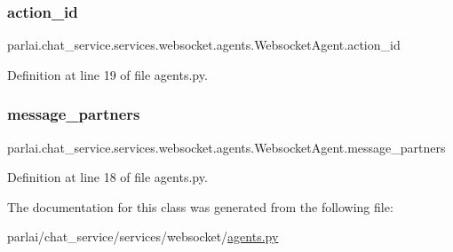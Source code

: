 \subsubsection{\texorpdfstring{action\+\_\+id}{action\_id}}
{\footnotesize\ttfamily parlai.\+chat\+\_\+service.\+services.\+websocket.\+agents.\+Websocket\+Agent.\+action\+\_\+id}



Definition at line 19 of file agents.\+py.

\mbox{\label{classparlai_1_1chat__service_1_1services_1_1websocket_1_1agents_1_1WebsocketAgent_acdde68c9a11ff8d7cbc968d26f166061}} 
\subsubsection{\texorpdfstring{message\+\_\+partners}{message\_partners}}
{\footnotesize\ttfamily parlai.\+chat\+\_\+service.\+services.\+websocket.\+agents.\+Websocket\+Agent.\+message\+\_\+partners}



Definition at line 18 of file agents.\+py.



The documentation for this class was generated from the following file\+:\begin{DoxyCompactItemize}
\item 
parlai/chat\+\_\+service/services/websocket/\hyperlink{parlai_2chat__service_2services_2websocket_2agents_8py}{agents.\+py}\end{DoxyCompactItemize}
